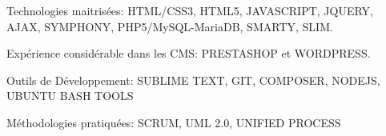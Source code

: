 \begin{cventries}
  \cventry
    {}
    {}
    {}
    {}
    {
      \begin{cvitems}
        \item {Technologies maitrisées: HTML/CSS3, HTML5, JAVASCRIPT, JQUERY, AJAX, SYMPHONY, PHP5/MySQL-MariaDB, SMARTY, SLIM.}
        \item {Expérience considérable dans les CMS: PRESTASHOP et WORDPRESS.}
        \item {Outils de Développement: SUBLIME TEXT, GIT, COMPOSER, NODEJS, UBUNTU BASH TOOLS}
        \item {Méthodologie​s pratiquées: SCRUM, UML 2.0, UNIFIED PROCESS}
      \end{cvitems}
    }
\end{cventries}